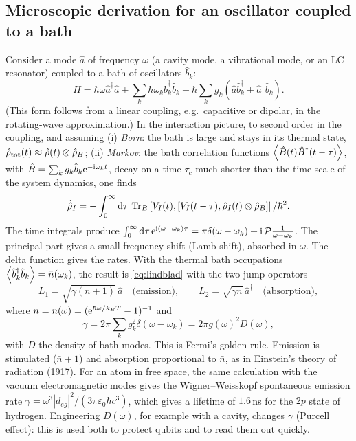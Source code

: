 \subsection{Microscopic derivation for an oscillator coupled to a bath\starred}
\begin{origin}
Consider a mode $\hat a$ of frequency $\omega$ (a cavity mode, a vibrational mode, or an LC resonator) coupled to a bath of oscillators $\hat b_k$:
\begin{equation}
  H=\hbar\omega\hat a^\dagger\hat a+\sum_k\hbar\omega_k\hat b_k^\dagger\hat b_k+\hbar\sum_kg_k\left(\hat a\hat b_k^\dagger+\hat a^\dagger\hat b_k\right).
\end{equation}
(This form follows from a linear coupling, e.g.\ capacitive or dipolar, in the rotating-wave approximation.) In the interaction picture, to second order in the coupling,
and assuming (i) \emph{Born}: the bath is large and stays in its thermal state, $\hat\rho_{\rm tot}(t)\approx\hat\rho(t)\otimes\hat\rho_B$; (ii) \emph{Markov}: the bath
correlation functions $\left\langle\hat B(t)\hat B^\dagger(t-\tau)\right\rangle$, with $\hat B=\sum_kg_k\hat b_k\mathrm e^{-\mathrm i\omega_kt}$, decay on a time $\tau_c$ much shorter than the time
scale of the system dynamics, one finds
\begin{equation}
  \dot{\hat\rho}_I=-\int_0^\infty\mathrm d\tau\,\operatorname{Tr}_B\left[V_I(t),\left[V_I(t-\tau),\hat\rho_I(t)\otimes\hat\rho_B\right]\right]/\hbar^2 .
\end{equation}
The time integrals produce $\int_0^\infty\mathrm d\tau\,\mathrm e^{\mathrm i(\omega-\omega_k)\tau}=\pi\delta(\omega-\omega_k)+\mathrm i\,\mathcal P\frac1{\omega-\omega_k}$. The principal part
gives a small frequency shift (Lamb shift), absorbed in $\omega$. The delta function gives the rates. With the thermal bath occupations
$\left\langle\hat b_k^\dagger\hat b_k\right\rangle=\bar n(\omega_k)$, the result is \cref{eq:lindblad} with the two jump operators
\begin{equation}
  L_1=\sqrt{\gamma(\bar n+1)}\,\hat a\quad\text{(emission)},\qquad L_2=\sqrt{\gamma\bar n}\,\hat a^\dagger\quad\text{(absorption)},
\end{equation}
where $\bar n=\bar n(\omega)=(\mathrm e^{\hbar\omega/k_BT}-1)^{-1}$ and
\begin{equation}
  \gamma=2\pi\sum_kg_k^2\delta(\omega-\omega_k)=2\pi g(\omega)^2D(\omega),
\end{equation}
with $D$ the density of bath modes. This is Fermi's golden rule. Emission is stimulated ($\bar n+1$) and absorption proportional to $\bar n$, as in Einstein's theory of
radiation (1917). For an atom in free space, the same calculation with the vacuum electromagnetic modes gives the Wigner--Weisskopf spontaneous emission rate
$\gamma=\omega^3|d_{eg}|^2/(3\pi\varepsilon_0\hbar c^3)$, which gives a lifetime of $1.6$\,ns for the $2p$ state of hydrogen. Engineering $D(\omega)$, for example with a
cavity, changes $\gamma$ (Purcell effect): this is used both to protect qubits and to read them out quickly.
\end{origin}

